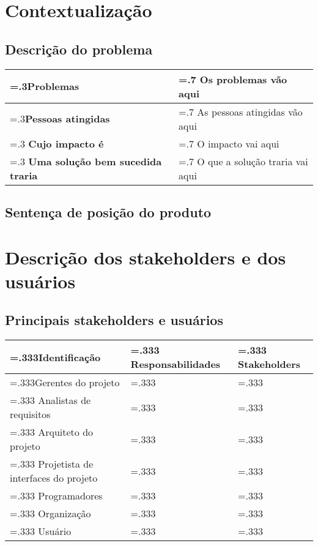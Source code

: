 \documentclass[12pt, a4paper]{article}
\begin{document}
    \section{Contextualização}
        \subsection{Descrição do problema}
                \begin{tabularx}{\textwidth}
                    {
                    >{\hsize=.3\hsize}X |
                    >{\hsize=.7\hsize}X
                    }
                \hline
                \textbf{Problemas} &
                Os problemas vão aqui \\ \hline
                \textbf{Pessoas atingidas} &
                As pessoas atingidas vão aqui \\ \hline
                \textbf{Cujo impacto é} &
                O impacto vai aqui \\ \hline
                \textbf{Uma solução bem \newline sucedida traria} &
                O que a solução traria vai aqui \\ \hline
                \end{tabularx}

    \subsection{Sentença de posição do produto}

    \section{Descrição dos stakeholders e dos usuários}
        \subsection{Principais stakeholders e usuários}
                \begin{tabularx}{\textwidth}
                    {
                    >{\hsize=.333\hsize}X |
                    >{\hsize=.333\hsize}X |
                    >{\hsize=.333\hsize}X
                    }
                \hline
                \textbf{Identificação} &
                \textbf{Responsabilidades} &
                \textbf{Stakeholders} \\ \hline
                Gerentes do projeto & & \\ \hline
                Analistas de requisitos & & \\ \hline
                Arquiteto do projeto & & \\ \hline
                Projetista de interfaces do projeto & & \\ \hline
                Programadores & & \\ \hline
                Organização & & \\ \hline
                Usuário & & \\
                \end{tabularx}
\end{document}
